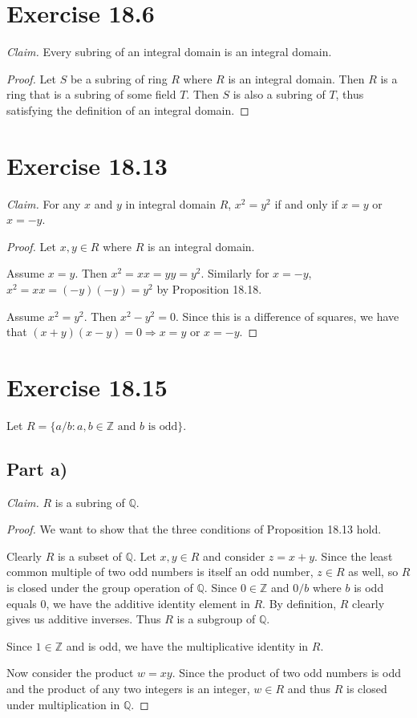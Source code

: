 \documentclass{abrice}
\newcommand{\Z}{\mathbb{Z}}
\newcommand{\Q}{\mathbb{Q}}
\begin{document}
\section{Exercise 18.6}

\emph{Claim.} Every subring of an integral domain is an integral domain.

\begin{proof}
  Let $S$ be a subring of ring $R$ where $R$ is an integral domain. Then $R$ is
  a ring that is a subring of some field $T$. Then $S$ is also a subring of $T$,
  thus satisfying the definition of an integral domain.
\end{proof}

\section{Exercise 18.13}

\emph{Claim.} For any $x$ and $y$ in integral domain $R$, $x^2 = y^2$ if and
only if $x = y$ or $x = -y$.

\begin{proof}
  Let $x,y \in R$ where $R$ is an integral domain.

  Assume $x = y$. Then $x^2 = xx = yy = y^2$. Similarly for $x = -y$, $x^2 = xx
  = (-y)(-y) = y^2$ by Proposition 18.18.

  Assume $x^2 = y^2$. Then $x^2 - y^2 = 0$. Since this is a difference of
  squares, we have that $(x + y)(x - y) = 0 \Longrightarrow x = y$ or $x = -y$.
\end{proof}

\section{Exercise 18.15}

Let $R = \{a/b : a,b \in \Z \text{ and } b \text{ is odd}\}$.

\subsection{Part a)}

\emph{Claim.} $R$ is a subring of $\Q$.

\begin{proof}
  We want to show that the three conditions of Proposition 18.13 hold.

  Clearly $R$ is a subset of $\Q$. Let $x,y \in R$ and consider $z = x + y$.
  Since the least common multiple of two odd numbers is itself an odd number, $z
  \in R$ as well, so $R$ is closed under the group operation of $\Q$. Since $0
  \in \Z$ and $0/b$ where $b$ is odd equals $0$, we have the additive identity
  element in $R$. By definition, $R$ clearly gives us additive inverses. Thus
  $R$ is a subgroup of $\Q$.

  Since $1 \in \Z$ and is odd, we have the multiplicative identity in $R$.

  Now consider the product $w = xy$. Since the product of two odd numbers is odd
  and the product of any two integers is an integer, $w \in R$ and thus $R$ is
  closed under multiplication in $\Q$.
\end{proof}
\end{document}
